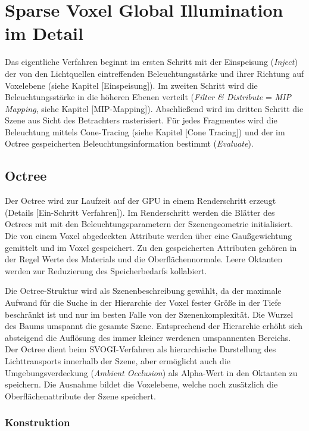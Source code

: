 \chapter{Sparse Voxel Global Illumination im Detail}
\label{chap:svogi}

Das eigentliche Verfahren beginnt im ersten Schritt mit der Einspeisung (\textit{Inject}) der von den Lichtquellen eintreffenden Beleuchtungsstärke und ihrer Richtung auf Voxelebene (siehe Kapitel [Einspeisung]). Im zweiten Schritt wird die Beleuchtungsstärke in die höheren Ebenen verteilt (\textit{Filter \& Distribute} = \textit{MIP Mapping}, siehe Kapitel [MIP-Mapping]). Abschließend wird im dritten Schritt die Szene aus Sicht des Betrachters rasterisiert. Für jedes Fragmentes wird die Beleuchtung mittels Cone-Tracing (siehe Kapitel [Cone Tracing]) und der im Octree gespeicherten Beleuchtungsinformation bestimmt (\textit{Evaluate}).

\section{Octree}
\label{sec:octree}

Der Octree wird zur Laufzeit auf der GPU in einem Renderschritt erzeugt (Details [Ein-Schritt Verfahren]). Im Renderschritt werden die Blätter des Octrees mit mit den Beleuchtungsparametern der Szenengeometrie initialisiert. Die von einem Voxel abgedeckten Attribute werden über eine Gaußgewichtung gemittelt und im Voxel gespeichert. Zu den gespeicherten Attributen gehören in der Regel Werte des Materials  und die Oberflächennormale. Leere Oktanten werden zur Reduzierung des Speicherbedarfs kollabiert.

Die Octree-Struktur wird als Szenenbeschreibung gewählt, da der maximale Aufwand für die Suche in der Hierarchie der Voxel fester Größe in der Tiefe beschränkt ist und nur im besten Falle von der Szenenkomplexität. Die Wurzel des Baums umspannt die gesamte Szene. Entsprechend der Hierarchie erhöht sich absteigend die Auflösung des immer kleiner werdenen umspannenten Bereichs. Der Octree dient beim SVOGI-Verfahren als hierarchische Darstellung des Lichttransports innerhalb der Szene, aber ermöglicht auch die Umgebungsverdeckung (\textit{Ambient Occlusion}) als Alpha-Wert in den Oktanten zu speichern. Die Ausnahme bildet die Voxelebene, welche noch zusätzlich die Oberflächenattribute der Szene speichert.

\subsection{Konstruktion}

